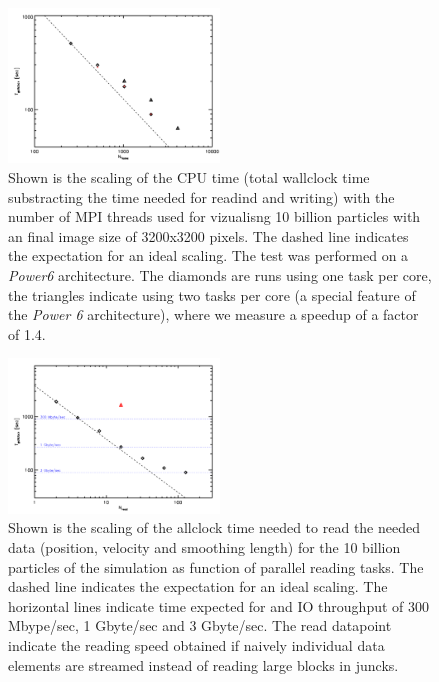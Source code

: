 \begin{figure}
\begin{center}
\includegraphics[width=0.5\textwidth]{t_cpu.pdf}
\end{center}
\caption{Shown is the scaling of the CPU time (total wallclock time substracting the time needed for 
readind and writing) with the number of MPI threads used for vizualisng 10 billion particles with an final
image size of 3200x3200 pixels. The dashed line indicates the expectation for an ideal scaling. The test was 
performed on a {\it Power6} architecture. The diamonds are runs using one task per core, the triangles indicate
using two tasks per core (a special feature of the {\it Power 6} architecture), where we measure a speedup of 
a factor of 1.4.}\label{cpu_scaling}
\end{figure}

\begin{figure}
\begin{center}
\includegraphics[width=0.5\textwidth]{t_read.pdf}
\end{center}
\caption{Shown is the scaling of the allclock time needed to read the needed data 
(position, velocity and smoothing length) for the 10 billion particles of the simulation
as function of parallel reading tasks. The dashed line indicates the expectation for an 
ideal scaling. The horizontal lines indicate time expected for and IO throughput of 300 Mbype/sec,
1 Gbyte/sec and 3 Gbyte/sec. The read datapoint indicate the reading speed obtained if naively 
individual data elements are streamed instead of reading large blocks in juncks.}\label{read_scaling}
\end{figure}


